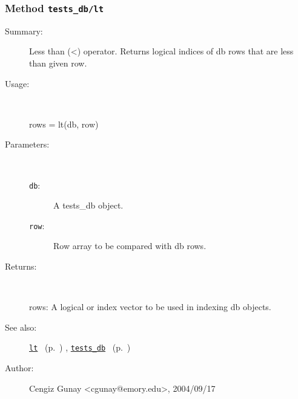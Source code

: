 \subsubsection[Method \texttt{lt}]{Method \texttt{tests\_db/lt}}%
%
\label{ref_tests_db__lt}%
\hypertarget{ref_tests_db__lt}{}%
\begin{description}
\item[Summary:]Less than (<) operator. Returns logical indices of db rows 
	that are less than given row.
%
\item[Usage:]~%
\begin{lyxcode}%
rows = lt(db, row)
%
\end{lyxcode}%
%
%
\item[Parameters:]~
\begin{description}%
\item[\texttt{db}:]
 A tests\_db object.
\item[\texttt{row}:]
 Row array to be compared with db rows.
\end{description}%
%
\item[Returns:
]~

	rows: A logical or index vector to be used in indexing db objects. 
%
%
\item[See also:]%
\hyperlink{ref_lt}{\texttt{lt}}%
\ (p.~\pageref{ref_lt})%
%
, \hyperlink{ref_tests_db}{\texttt{tests\_db}}%
\ (p.~\pageref{ref_tests_db})%
%
%
\item[Author:]%
Cengiz Gunay <cgunay@emory.edu>, 2004/09/17
%
\end{description}
\methodline%
